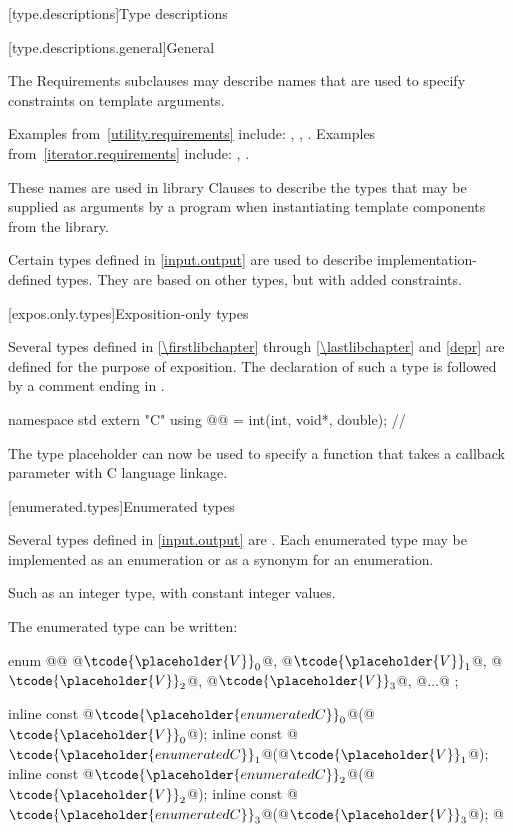[type.descriptions]{Type descriptions}

[type.descriptions.general]{General}

\pnum
The Requirements subclauses may describe names that are used to specify
constraints on template arguments.
\begin{footnote}
Examples
from~\ref{utility.requirements} include:
,
,
.
Examples from~\ref{iterator.requirements} include:
,
.
\end{footnote}
These names are used in library Clauses
to describe the types that
may be supplied as arguments by a \Cpp{} program when instantiating template components from
the library.

\pnum
Certain types defined in \ref{input.output} are used to describe implementation-defined types.
%
They are based on other types, but with added constraints.

[expos.only.types]{Exposition-only types}

\pnum
Several types defined in \ref{\firstlibchapter} through \ref{\lastlibchapter}
and \ref{depr} are defined for the purpose of exposition.
The declaration of such a type is followed by a comment ending in \expos.
\begin{example}
\begin{codeblock}
namespace std {
  extern "C" using @@ = int(int, void*, double);  // \expos
}
\end{codeblock}
The type placeholder  can now be used to specify a function
that takes a callback parameter with C language linkage.
\end{example}

[enumerated.types]{Enumerated types}

\pnum
Several types defined in \ref{input.output} are
.
Each enumerated type may be implemented as an enumeration or as a synonym for
an enumeration.
\begin{footnote}
Such as an integer type, with constant integer
values.
\end{footnote}

\pnum
The enumerated type  can be written:
\begin{codeblock}
enum @@ { @$\tcode{\placeholder{V}}_{0}$@, @$\tcode{\placeholder{V}}_{1}$@, @$\tcode{\placeholder{V}}_{2}$@, @$\tcode{\placeholder{V}}_{3}$@, @$\ldots$@ };

inline const @$\tcode{\placeholder{enumerated C}}_{0}$@(@$\tcode{\placeholder{V}}_{0}$@);
inline const @$\tcode{\placeholder{enumerated C}}_{1}$@(@$\tcode{\placeholder{V}}_{1}$@);
inline const @$\tcode{\placeholder{enumerated C}}_{2}$@(@$\tcode{\placeholder{V}}_{2}$@);
inline const @$\tcode{\placeholder{enumerated C}}_{3}$@(@$\tcode{\placeholder{V}}_{3}$@);
  @\vdots@
\end{codeblock}

